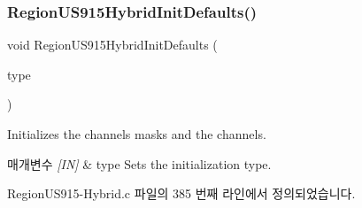 \subsubsection{\texorpdfstring{Region\+U\+S915\+Hybrid\+Init\+Defaults()}{RegionUS915HybridInitDefaults()}}
{\footnotesize\ttfamily void Region\+U\+S915\+Hybrid\+Init\+Defaults (\begin{DoxyParamCaption}\item[{\mbox{\hyperlink{group___r_e_g_i_o_n_gaddc73ae10673ec925724e7870363bda9}{Init\+Type\+\_\+t}}}]{type }\end{DoxyParamCaption})}



Initializes the channels masks and the channels. 


\begin{DoxyParams}{매개변수}
{\em \mbox{[}\+I\+N\mbox{]}} & type Sets the initialization type. \\
\hline
\end{DoxyParams}


Region\+U\+S915-\/\+Hybrid.\+c 파일의 385 번째 라인에서 정의되었습니다.


